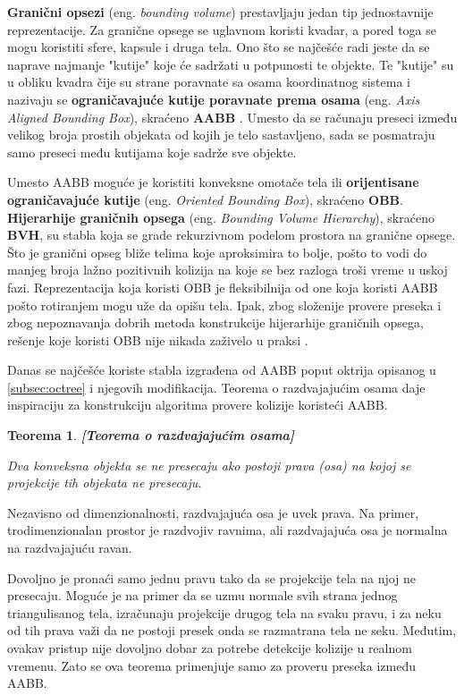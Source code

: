 \documentclass[12pt,oneside]{memoir}
\newtheorem{teo}{Teorema}[section]
\begin{document}
\textbf{Granični opsezi} (eng. {\em bounding volume}) prestavljaju jedan tip jednostavnije reprezentacije.
Za granične opsege se uglavnom koristi kvadar, a pored toga se mogu koristiti sfere, kapsule i druga tela.
Ono što se najčešće radi jeste da se naprave najmanje "kutije" koje će sadržati u potpunosti te objekte.
Te "kutije" su u obliku kvadra čije su strane poravnate sa osama koordinatnog sistema i nazivaju se
\textbf{ograničavajuće kutije poravnate prema osama} (eng. {\em Axis Aligned Bounding Box}), skraćeno \textbf{ AABB }.
Umesto da se računaju preseci između velikog broja prostih objekata od kojih je telo sastavljeno, sada se posmatraju 
samo preseci među kutijama koje sadrže sve objekte.

Umesto AABB moguće je koristiti konveksne omotače tela ili \textbf{orijentisane ograničavajuće kutije} (eng. {\em Oriented Bounding Box}), skraćeno \textbf{OBB}.
\textbf{Hijerarhije graničnih opsega} (eng. {\em Bounding Volume Hierarchy}), skraćeno \textbf{BVH}, su stabla koja se grade rekurzivnom podelom 
prostora na granične opsege. Što je granični opseg bliže telima koje aproksimira to bolje, pošto to vodi do manjeg broja 
lažno pozitivnih kolizija na koje se bez razloga troši vreme u uskoj fazi. 
Reprezentacija koja koristi OBB je fleksibilnija od one koja koristi AABB pošto rotiranjem mogu uže da opišu tela. 
Ipak, zbog složenije provere preseka i zbog nepoznavanja dobrih metoda konstrukcije hijerarhije graničnih
opsega, rešenje koje koristi OBB nije nikada zaživelo u praksi \cite{obb}. 

Danas se najčešće koriste stabla izgrađena od AABB poput oktrija opisanog u \ref{subsec:octree} i njegovih modifikacija. 
Teorema o razdvajajućim osama daje inspiraciju za konstrukciju algoritma provere kolizije koristeći AABB.

\begin{teo}
	\textbf{[Teorema o razdvajajućim osama]}

	Dva konveksna objekta se ne presecaju ako postoji prava (osa) na kojoj se projekcije 
	tih objekata ne presecaju. 
\end{teo}

Nezavisno od dimenzionalnosti, razdvajajuća osa je uvek prava. Na primer, trodimenzionalan prostor
je razdvojiv ravnima, ali razdvajajuća osa je normalna na razdvajajuću ravan.

Dovoljno je pronaći samo jednu pravu tako da se projekcije tela na njoj ne presecaju.
Moguće je na primer da se uzmu normale svih strana jednog triangulisanog tela, izračunaju projekcije drugog 
tela na svaku pravu, i za neku od tih prava važi da ne postoji presek onda se razmatrana tela ne seku.
Međutim, ovakav pristup nije dovoljno dobar za potrebe detekcije kolizije u realnom vremenu. 
Zato se  ova teorema primenjuje samo za proveru preseka između AABB.
\end{document}
